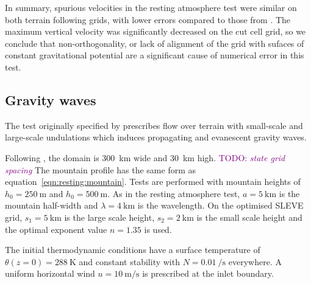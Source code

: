\documentclass{ametsoc}
\newcommand{\TODO}[1]{\textcolor{purple}{TODO: \emph{#1}}}
\begin{document}
In summary, spurious velocities in the resting atmosphere test were similar on both terrain following grids, with lower errors compared to those from \citet{klemp2011}.  The maximum vertical velocity was significantly decreased on the cut cell grid, so we conclude that non-orthogonality, or lack of alignment of the grid with sufaces of constant gravitational potential are a significant cause of numerical error in this test.


\subsection{Gravity waves}
\label{sec:gw}
The test originally specified by \citet{schaer2002} prescribes flow over terrain with small-scale and large-scale undulations which induces propagating and evanescent gravity waves.

Following \citet{melvin2010}, the domain is \SI{300}{\kilo\meter} wide and \SI{30}{\kilo\meter} high.  \TODO{state grid spacing} The mountain profile has the same form as equation~\ref{eqn:resting:mountain}.  Tests are performed with mountain heights of $h_0 = \SI{250}{\meter}$ and \(h_0 = \SI{500}{\meter}\).  As in the resting atmosphere test, $a = \SI{5}{\kilo\meter}$ is the mountain half-width and $\lambda = \SI{4}{\kilo\meter}$ is the wavelength.  On the optimised SLEVE grid, $s_1 = \SI{5}{\kilo\meter}$ is the large scale height, $s_2 = \SI{2}{\kilo\meter}$ is the small scale height and the optimal exponent value $n = 1.35$ is used.

The initial thermodynamic conditions have a surface temperature of $\theta(z=0) = \SI{288}{\kelvin}$ and constant stability with $N = \SI{0.01}{\per\second}$ everywhere.  A uniform horizontal wind $u = \SI{10}{\meter\per\second}$ is prescribed at the inlet boundary.
\end{document}
